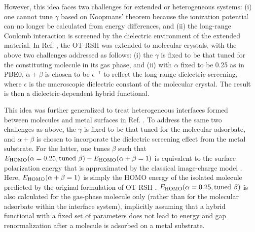 \documentclass[aip, amsmath, amssymb, reprint, longbibliography]{revtex4-2}
\begin{document}
However, this idea faces two challenges for extended or heterogeneous systems: (i) one cannot tune $\gamma$ based on Koopmans' theorem because the ionization potential can no longer be calculated from energy differences, and (ii) the long-range Coulomb interaction is screened by the dielectric environment of the extended material. In Ref. , the OT-RSH was extended to molecular crystals, with the above two challenges addressed as follows: (i) the $\gamma$ is fixed to be that tuned for the constituting molecule in its gas phase, and (ii) with $\alpha$ fixed to be 0.25 as in PBE0, $\alpha+\beta$ is chosen to be $\epsilon^{-1}$ to reflect the long-range dielectric screening, where $\epsilon$ is the macroscopic dielectric constant of the molecular crystal. The result is then a dielectric-dependent hybrid functional.

This idea was further generalized to treat heterogeneous interfaces formed between molecules and metal surfaces in Ref. . To address the same two challenges as above, the $\gamma$ is fixed to be that tuned for the molecular adsorbate, and $\alpha+\beta$ is chosen to incorporate the dielectric screening effect from the metal substrate. For the latter, one tunes $\beta$ such that $E_{\rm HOMO}(\alpha=0.25,\mbox{tuned }\beta)-E_{\rm HOMO}(\alpha+\beta=1)$ is equivalent to the surface polarization energy that is approximated by the classical image-charge model \cite{NHL06,ELNK15}. Here, $E_{\rm HOMO}(\alpha+\beta=1)$ is simply the HOMO energy of the isolated molecule predicted by the original formulation of OT-RSH \cite{RSGA12}. $E_{\rm HOMO}(\alpha=0.25,\mbox{tuned }\beta)$ is also calculated for the gas-phase molecule only (rather than for the molecular adsorbate within the interface system), implicitly assuming that a hybrid functional with a fixed set of parameters does not lead to energy and gap renormalization after a molecule is adsorbed on a metal substrate\cite{BTNK11}. 
\end{document}
